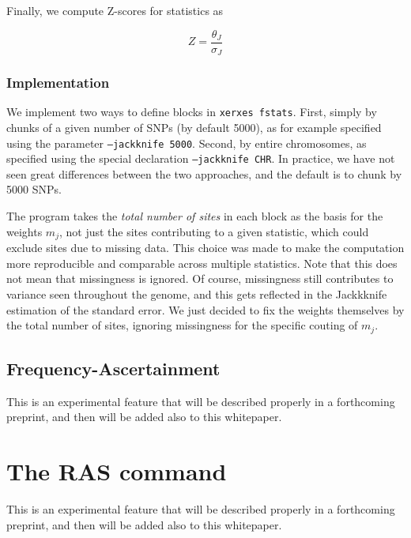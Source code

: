 \documentclass{article}
\begin{document}
Finally, we compute Z-scores for statistics as

$$Z=\frac{\theta_J}{\sigma_J}$$

\subsubsection{Implementation}

We implement two ways to define blocks in \texttt{xerxes fstats}. First, simply by chunks of a given number of SNPs (by default 5000), as for example specified using the parameter \texttt{--jackknife 5000}. Second, by entire chromosomes, as specified using the special declaration \texttt{--jackknife CHR}. In practice, we have not seen great differences between the two approaches, and the default is to chunk by 5000 SNPs.

The program takes the \emph{total number of sites} in each block as the basis for the weights $m_j$, not just the sites contributing to a given statistic, which could exclude sites due to missing data. This choice was made to make the computation more reproducible and comparable across multiple statistics. Note that this does not mean that missingness is ignored. Of course, missingness still contributes to variance seen throughout the genome, and this gets reflected in the Jackkknife estimation of the standard error. We just decided to fix the weights themselves by the total number of sites, ignoring missingness for the specific couting of $m_j$.

\subsection{Frequency-Ascertainment}
This is an experimental feature that will be described properly in a forthcoming preprint, and then will be added also to this whitepaper.

\section{The RAS command}
This is an experimental feature that will be described properly in a forthcoming preprint, and then will be added also to this whitepaper.

\printbibliography
\end{document}
